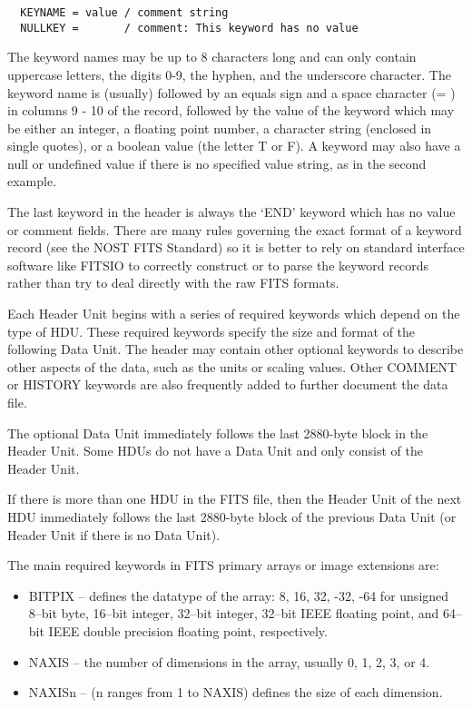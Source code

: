 \documentclass[11pt]{book}
\begin{document}
\begin{verbatim}
  KEYNAME = value / comment string
  NULLKEY =       / comment: This keyword has no value
\end{verbatim}
The keyword names may be up to 8 characters long and can only contain
uppercase letters, the digits 0-9, the hyphen, and the underscore
character. The keyword name is (usually) followed by an equals sign and
a space character (= ) in columns 9 - 10 of the record, followed by the
value of the keyword which may be either an integer, a floating point
number, a character string (enclosed in single quotes), or a boolean
value (the letter T or F).   A keyword may also have a null or undefined
value if there is no specified value string, as in the second example.

The last keyword in the header is always the `END' keyword which has no
value or comment fields. There are many rules governing the exact
format of a keyword record (see the NOST FITS Standard) so it is better
to rely on standard interface software like FITSIO to correctly
construct or to parse the keyword records rather than try to deal
directly with the raw FITS formats.

Each Header Unit begins with a series of required keywords which depend
on the type of HDU.  These required keywords specify the size and
format of the following Data Unit.  The header may contain other
optional keywords to describe other aspects of the data, such as the
units or scaling values.  Other COMMENT or HISTORY keywords are also
frequently added to further document the data file.

The optional Data Unit immediately follows the last 2880-byte block in
the Header Unit.  Some HDUs do not have a Data Unit and only consist of
the Header Unit.

If there is more than one HDU in the FITS file, then the Header Unit of
the next HDU immediately follows the last 2880-byte block of the
previous Data Unit (or Header Unit if there is no Data Unit).

The main required keywords in FITS primary arrays or image extensions are:
\begin{itemize}
\item
BITPIX -- defines the datatype of the array: 8, 16, 32, -32, -64
for unsigned 8--bit byte, 16--bit integer, 32--bit integer, 32--bit
IEEE floating point, and 64--bit IEEE double precision floating point,
respectively.
\item
NAXIS --  the number of dimensions in the array, usually 0, 1, 2, 3, or 4.
\item
NAXISn -- (n ranges from 1 to NAXIS) defines the size of each dimension.
\end{itemize}
\end{document}

